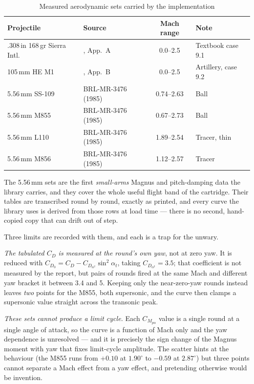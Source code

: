\documentclass[11pt,twoside,openright]{report}
\begin{document}
\begin{table}[H]
\centering
\caption{Measured aerodynamic sets carried by the implementation}
\label{tab:measured_sets}
\begin{tabular}{@{}llcl@{}}
\toprule
\textbf{Projectile} & \textbf{Source} & \textbf{Mach range} & \textbf{Note} \\
\midrule
.308\,in 168\,gr Sierra Intl. & \citet{mccoy1999modern}, App.~A & 0.0--2.5 & Textbook case 9.1 \\
105\,mm HE M1 & \citet{mccoy1999modern}, App.~B & 0.0--2.5 & Artillery, case 9.2 \\
5.56\,mm SS-109 & BRL-MR-3476 (1985) & 0.74--2.63 & Ball \\
5.56\,mm M855 & BRL-MR-3476 (1985) & 0.67--2.73 & Ball \\
5.56\,mm L110 & BRL-MR-3476 (1985) & 1.89--2.54 & Tracer, thin \\
5.56\,mm M856 & BRL-MR-3476 (1985) & 1.12--2.57 & Tracer \\
\bottomrule
\end{tabular}
\end{table}

The 5.56\,mm sets are the first \emph{small-arms} Magnus and pitch-damping data the
library carries, and they cover the whole useful flight band of the cartridge. Their
tables are transcribed round by round, exactly as printed, and every curve the
library uses is derived from those rows at load time --- there is no second,
hand-copied copy that can drift out of step.

Three limits are recorded with them, and each is a trap for the unwary.

\emph{The tabulated $C_D$ is measured at the round's own yaw}, not at zero yaw. It is
reduced with $C_{D_0} = C_D - C_{D_{\alpha^2}}\sin^2\alpha_t$, taking
$C_{D_{\alpha^2}} = 3.5$; that coefficient is not measured by the report, but pairs
of rounds fired at the same Mach and different yaw bracket it between 3.4 and 5.
Keeping only the near-zero-yaw rounds instead leaves \emph{two} points for the M855,
both supersonic, and the curve then clamps a supersonic value straight across the
transonic peak.

\emph{These sets cannot produce a limit cycle.} Each $C_{M_{p\alpha}}$ value is a
single round at a single angle of attack, so the curve is a function of Mach only and
the yaw dependence is unresolved --- and it is precisely the sign change of the
Magnus moment with yaw that fixes limit-cycle amplitude. The scatter hints at the
behaviour (the M855 runs from $+0.10$ at $1.90^{\circ}$ to $-0.59$ at $2.87^{\circ}$)
but three points cannot separate a Mach effect from a yaw effect, and pretending
otherwise would be invention.
\end{document}
